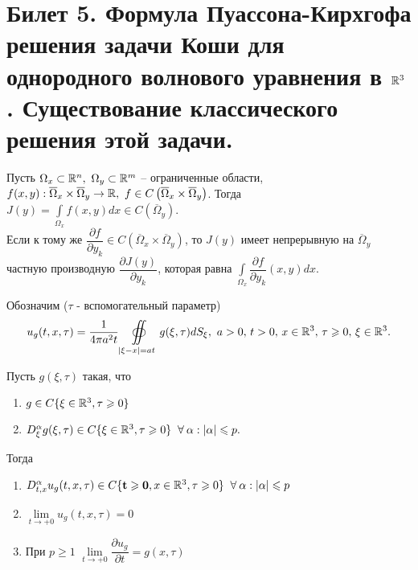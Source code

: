 \documentclass[../main.tex]{subfiles}
\begin{document}
\section{Билет 5. Формула Пуассона-Кирхгофа решения задачи Коши для однородного волнового уравнения в \texorpdfstring{$\mathbb{R}^3$}{R\textasciicircum 3}. Существование классического решения этой задачи.}
\begin{theorem}
Пусть $\Omega_x\subset\R^n,\ \Omega_y\subset\R^m$ -- ограниченные области, $f(x,y):\overline{\Omega}_x\times\overline{\Omega}_y\rightarrow \mathbb{R},\ f\in C\left(\overline{\Omega}_x\times\overline{\Omega}_y \right)$. Тогда $J(y)=\displaystyle\int\limits_{\Omega_x}f(x,y)dx\in C\left(\overline{\Omega}_y \right)$.\\
Если к тому же $\dfrac{\partial f}{\partial y_k}\in C\left(\overline{\Omega}_x\times\overline{\Omega}_y \right)$, то $J(y)$ имеет непрерывную на $\overline{\Omega}_y$ частную производную $\dfrac{\partial J(y)}{\partial y_k}$, которая равна $\displaystyle\int\limits_{\Omega_x}\dfrac{\partial f}{\partial y_k}(x,y)dx.$
\end{theorem}
Обозначим ($\tau$ - вспомогательный параметр)
\[
u_g(t,x,\tau)=\frac{1}{4\pi a^2t}\displaystyle\oiint\limits_{|\xi - x|=at}g(\xi ,\tau ) dS_{\xi},\ a>0,\, t> 0,\, x\in \R^3,\, \tau \geq 0,\, \xi\in\R^3.
\]
\begin{lemma}
\label{lem:5:continuity}
Пусть $g(\xi, \tau )$ такая, что 
\begin{enumerate}
\item $g \in C\{\xi\in\mathbb{R}^3,\tau\geqslant 0 \}$
\item $D_{\xi}^{\alpha}g(\xi , \tau )\in C\{\xi\in\mathbb{R}^3,\tau\geqslant 0 \} \;\;\forall\:\alpha : |\alpha |\leqslant p.$
\end{enumerate}
Тогда
\begin{enumerate}
\item $D_{t,x}^{\alpha}u_g(t,x,\tau )\in C\{\mathbf{t\geqslant 0}, x\in\mathbb{R}^3,\tau\geqslant 0 \} \;\;\forall\:\alpha : |\alpha |\leqslant p$
\item $\lim\limits_{t\rightarrow +0}u_g(t,x,\tau )=0$
\item При $p\geq 1$ $\lim\limits_{t\rightarrow +0}\dfrac{\partial u_g}{\partial t}=g(x,\tau)$
\end{enumerate}
\end{lemma}
\end{document}
